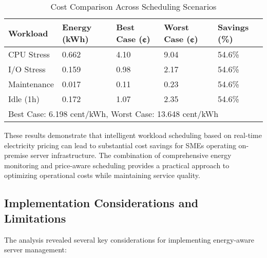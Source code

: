 \begin{table}[h]
\caption{Cost Comparison Across Scheduling Scenarios}
\label{tab:cost-comparison}
\begin{tabular}{lllll}
\hline
\textbf{Workload} & \textbf{Energy (kWh)} & \textbf{Best Case (¢)} & \textbf{Worst Case (¢)} & \textbf{Savings (\%)} \\
\hline
CPU Stress & 0.662 & 4.10 & 9.04 & 54.6\% \\
I/O Stress & 0.159 & 0.98 & 2.17 & 54.6\% \\
Maintenance & 0.017 & 0.11 & 0.23 & 54.6\% \\
Idle (1h) & 0.172 & 1.07 & 2.35 & 54.6\% \\
\hline
\multicolumn{5}{l}{\small Best Case: 6.198 cent/kWh, Worst Case: 13.648 cent/kWh} \\
\end{tabular}
\end{table}

These results demonstrate that intelligent workload scheduling based on real-time electricity pricing can lead to substantial cost savings for SMEs operating on-premise server infrastructure. The combination of comprehensive energy monitoring and price-aware scheduling provides a practical approach to optimizing operational costs while maintaining service quality.

\subsection{Implementation Considerations and Limitations}
\label{results:limitations}
The analysis revealed several key considerations for implementing energy-aware server management:

